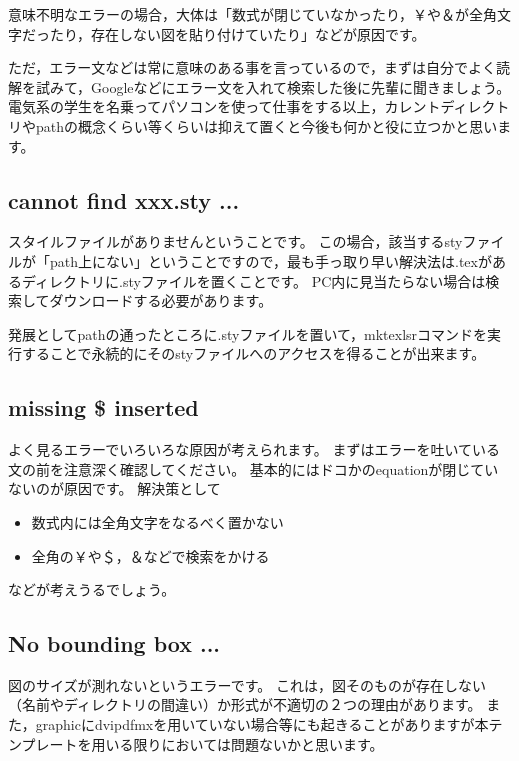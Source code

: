 \documentclass[10pt,a4paper,oneside,twocolumn,fleqn,dvipdfmx]{jsarticle}
\begin{document}
意味不明なエラーの場合，大体は「数式が閉じていなかったり，￥や＆が全角文字だったり，存在しない図を貼り付けていたり」などが原因です。

ただ，エラー文などは常に意味のある事を言っているので，まずは自分でよく読解を試みて，Googleなどにエラー文を入れて検索した後に先輩に聞きましょう。電気系の学生を名乗ってパソコンを使って仕事をする以上，カレントディレクトリやpathの概念くらい等くらいは抑えて置くと今後も何かと役に立つかと思います。

\subsection{cannot find xxx.sty ...}
スタイルファイルがありませんということです。
この場合，該当するstyファイルが「path上にない」ということですので，最も手っ取り早い解決法は.texがあるディレクトリに.styファイルを置くことです。
PC内に見当たらない場合は検索してダウンロードする必要があります。

発展としてpathの通ったところに.styファイルを置いて，mktexlsrコマンドを実行することで永続的にそのstyファイルへのアクセスを得ることが出来ます。

\subsection{missing \$ inserted}
よく見るエラーでいろいろな原因が考えられます。
まずはエラーを吐いている文の前を注意深く確認してください。
基本的にはドコかのequationが閉じていないのが原因です。
解決策として
\begin{itemize}
	\item 数式内には全角文字をなるべく置かない
	\item 全角の￥や＄，＆などで検索をかける
\end{itemize}
などが考えうるでしょう。

\subsection{No bounding box ...}
図のサイズが測れないというエラーです。
これは，図そのものが存在しない（名前やディレクトリの間違い）か形式が不適切の２つの理由があります。
また，graphicにdvipdfmxを用いていない場合等にも起きることがありますが本テンプレートを用いる限りにおいては問題ないかと思います。
\end{document}
